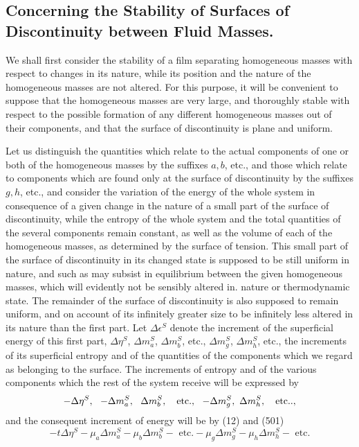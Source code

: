 \documentclass[12pt]{article}
\begin{document}
{\subsection{Concerning the Stability of Surfaces of Discontinuity between Fluid Masses.}
We shall first consider the stability of a film separating homogeneous masses with respect to changes in its nature, while its position and the nature of the homogeneous masses are not altered. For this purpose, it will be convenient to suppose that the homogeneous masses are very large, and thoroughly stable with respect to the possible formation of any different homogeneous masses out of their components, and that the surface of discontinuity is plane and uniform.

Let us distinguish the quantities which relate to the actual components of one or both of the homogeneous masses by the suffixes $a, b$, etc., and those which relate to components which are found only at the surface of discontinuity by the suffixes $g,h$,  etc., and consider the variation of the energy of the whole system in consequence of a given change in the nature of a small part of the surface of discontinuity, while the entropy of the whole system and the total quantities of the several components remain constant, as well as the volume of each of the homogeneous masses, as determined by the surface of tension. This small part of the surface of discontinuity in its changed state is supposed to be still uniform    in nature, and such as may subsist in equilibrium between the given homogeneous masses, which will evidently not be sensibly altered in. nature or thermodynamic state. The remainder of the surface of discontinuity is also supposed to remain uniform, and on account of its infinitely greater size to be infinitely less altered in its nature than the first part. Let $\Delta \epsilon^S$ denote the increment of the superficial energy of this first part, $\Delta \eta^S$, $\Delta m_a^S$, $\Delta m_b^S$, etc., $\Delta m_g^S$, $\Delta m_h^S$, etc., the increments of its superficial entropy and of the quantities of the components which we regard as belonging to the surface. The increments of entropy and of the various components which the rest of the system receive will be expressed by
$$ -\Delta \eta^S, \ \ -\Delta m_a^S,\ \ \Delta m_b^S, \ \ \text{ etc.}, \ \ -\Delta m_g^S, \ \-\Delta m_h^S, \ \ \text{ etc.}.,$$
and the consequent increment of energy will be by (12) and (501)
$$- t \Delta \eta^S - \mu_a \Delta m_a^S - \mu_b \Delta m_b^S - \text{ etc.} -  \mu_g \Delta m_g^S - \mu_h \Delta m_h^S- \text{ etc.}$$
}
\end{document}
